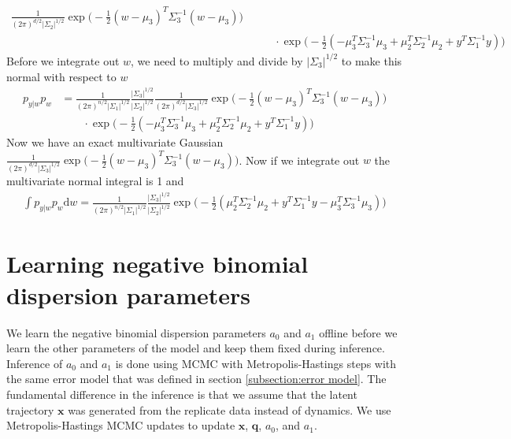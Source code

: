 \documentclass{article}
\newcommand{\qq}{\mathbf{q}}
\newcommand{\xx}{\mathbf{x}}
\begin{document}
\begin{appendices}
\begin{align}
    \frac{1}{(2 \pi)^{d/2} |\Sigma_2|^{1/2}}
    \exp{\big(
      -\frac{1}{2} (w - \mu_3)^T \Sigma_3^{-1} (w - \mu_3)
    \big)} \\
    & \quad \quad \cdot \exp{\big(
      -\frac{1}{2}(
        -\mu_3^T \Sigma_3^{-1} \mu_3 + \mu_2^T \Sigma_2^{-1} \mu_2
        + y^T \Sigma_1^{-1} y)
    \big)}
\end{align}
Before we integrate out $w$, we need to multiply and divide by $|\Sigma_3|^{1/2}$ to make this normal with respect to $w$
\begin{align}
  p_{y|w}p_w & =
    \frac{1}{(2 \pi)^{n/2} |\Sigma_1|^{1/2}}
    \frac{|\Sigma_3|^{1/2}}{|\Sigma_2|^{1/2}}
    \frac{1}{(2 \pi)^{d/2} |\Sigma_3|^{1/2}}
    \exp{\big(-\frac{1}{2}(w-\mu_3)^T \Sigma_3^{-1} (w-\mu_3) \big)} \\
    & \quad \quad \cdot \exp{\big(
    -\frac{1}{2}(
      -\mu_3^T \Sigma_3^{-1} \mu_3 + \mu_2^T \Sigma_2^{-1} \mu_2
      + y^T \Sigma_1^{-1} y)
    \big)}
\end{align}
Now we have an exact multivariate Gaussian $\frac{1}{(2 \pi)^{d/2} |\Sigma_3|^{1/2}} \exp{\big( -\frac{1}{2}(w - \mu_3)^T \Sigma_3^{-1} (w - \mu_3) \big)}$. Now if we integrate out $w$ the multivariate normal integral is 1 and
\begin{align}
  \label{eqn:marginalization}
  \int p_{y|w}p_w \text{d}w =
    \frac{1}{(2 \pi)^{n/2} | \Sigma_1 |^{1/2}}
    \frac{| \Sigma_3 |^{1/2}}{| \Sigma_2 |^{1/2}}
    \exp{\big(
      -\frac{1}{2}(
        \mu_2^T \Sigma_2^{-1} \mu_2 + y^T \Sigma_1^{-1} y - \mu_3^T \Sigma_3^{-1} \mu_3
      )
    \big)}
\end{align}

  \section{Learning negative binomial dispersion parameters}
  \label{appendix:learningas}
  We learn the negative binomial dispersion parameters $a_0$ and $a_1$ offline before we learn the other parameters of the model and keep them fixed during inference. Inference of $a_0$ and $a_1$ is done using MCMC with Metropolis-Hastings steps with the same error model that was defined in section \ref{subsection:error model}. The fundamental difference in the inference is that we assume that the latent trajectory $\xx$ was generated from the replicate data instead of dynamics. We use Metropolis-Hastings MCMC updates to update $\xx$, $\qq$, $a_0$, and $a_1$.


\end{appendices}
\end{document}
